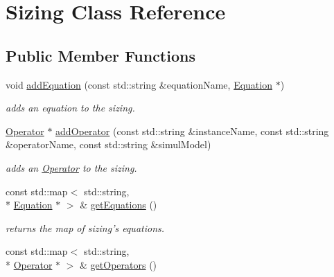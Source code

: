 \hypertarget{class_open_chams_1_1_sizing}{\section{Sizing Class Reference}
\label{class_open_chams_1_1_sizing}
}
\subsection*{Public Member Functions}
\begin{DoxyCompactItemize}
\item 
void \hyperlink{class_open_chams_1_1_sizing_a01f8823628bb567d1c463c8bef314ca7}{add\-Equation} (const std\-::string \&equation\-Name, \hyperlink{class_open_chams_1_1_equation}{Equation} $\ast$)
\begin{DoxyCompactList}\small\item\em adds an equation to the sizing. \end{DoxyCompactList}\item 
\hyperlink{class_open_chams_1_1_operator}{Operator} $\ast$ \hyperlink{class_open_chams_1_1_sizing_a712e045c11e463cff8411b3d0fd7f732}{add\-Operator} (const std\-::string \&instance\-Name, const std\-::string \&operator\-Name, const std\-::string \&simul\-Model)
\begin{DoxyCompactList}\small\item\em adds an \hyperlink{class_open_chams_1_1_operator}{Operator} to the sizing. \end{DoxyCompactList}\item 
\hypertarget{class_open_chams_1_1_sizing_aacce59a91d7919a2025c8611184d5bf3}{const std\-::map$<$ std\-::string, \\*
\hyperlink{class_open_chams_1_1_equation}{Equation} $\ast$ $>$ \& \hyperlink{class_open_chams_1_1_sizing_aacce59a91d7919a2025c8611184d5bf3}{get\-Equations} ()}\label{class_open_chams_1_1_sizing_aacce59a91d7919a2025c8611184d5bf3}

\begin{DoxyCompactList}\small\item\em returns the map of sizing's equations. \end{DoxyCompactList}\item 
\hypertarget{class_open_chams_1_1_sizing_ad35c9083b30dac45186f4f0eb49b435d}{const std\-::map$<$ std\-::string, \\*
\hyperlink{class_open_chams_1_1_operator}{Operator} $\ast$ $>$ \& \hyperlink{class_open_chams_1_1_sizing_ad35c9083b30dac45186f4f0eb49b435d}{get\-Operators} ()}\label{class_open_chams_1_1_sizing_ad35c9083b30dac45186f4f0eb49b435d}


\end{DoxyCompactItemize}

